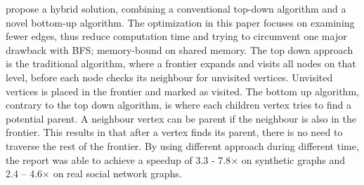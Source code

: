 \citep{beamer2013direction} propose a hybrid solution, combining a conventional top-down algorithm and a novel bottom-up algorithm. The optimization in this paper focuses on examining fewer edges, thus reduce computation time and trying to circumvent one major drawback with BFS; memory-bound on shared memory. The top down approach is the traditional algorithm, where a frontier expands and visits all nodes on that level, before each node checks its neighbour for unvisited vertices. Unvisited vertices is placed in the frontier and marked as visited. The bottom up algorithm, contrary to the top down algorithm, is where each children vertex tries to find a potential parent. A neighbour vertex can be parent if the neighbour is also in the frontier. This results in that after a vertex finds its parent, there is no need to traverse the rest of the frontier. By using different approach during different time, the report was able to achieve a speedup of 3.3 - 7.8$\times$ on synthetic graphs and 2.4 – 4.6$\times$ on real social network graphs.

\citep{Agarwal:2010:SGE:1884643.1884670}
